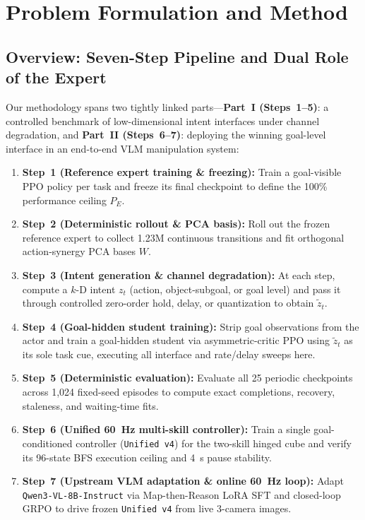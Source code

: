 \section{Problem Formulation and Method}
\label{sec:method}

\subsection{Overview: Seven-Step Pipeline and Dual Role of the Expert}
\label{sec:method_overview}
Our methodology spans two tightly linked parts---\textbf{Part~I (Steps~1--5)}: a controlled benchmark of low-dimensional intent interfaces under channel degradation, and \textbf{Part~II (Steps~6--7)}: deploying the winning goal-level interface in an end-to-end VLM manipulation system:
\begin{enumerate}[leftmargin=1.5em,itemsep=1.5pt,topsep=2pt]
  \item \textbf{Step~1 (Reference expert training \& freezing):} Train a goal-visible PPO policy per task and freeze its final checkpoint to define the 100\% performance ceiling $P_E$.
  \item \textbf{Step~2 (Deterministic rollout \& PCA basis):} Roll out the frozen reference expert to collect 1.23M continuous transitions and fit orthogonal action-synergy PCA bases $W$.
  \item \textbf{Step~3 (Intent generation \& channel degradation):} At each step, compute a $k$-D intent $z_t$ (action, object-subgoal, or goal level) and pass it through controlled zero-order hold, delay, or quantization to obtain $\tilde{z}_t$.
  \item \textbf{Step~4 (Goal-hidden student training):} Strip goal observations from the actor and train a goal-hidden student via asymmetric-critic PPO using $\tilde{z}_t$ as its sole task cue, executing all interface and rate/delay sweeps here.
  \item \textbf{Step~5 (Deterministic evaluation):} Evaluate all 25 periodic checkpoints across 1,024 fixed-seed episodes to compute exact completions, recovery, staleness, and waiting-time fits.
  \item \textbf{Step~6 (Unified 60~Hz multi-skill controller):} Train a single goal-conditioned controller (\texttt{Unified v4}) for the two-skill hinged cube and verify its 96-state BFS execution ceiling and 4~s pause stability.
  \item \textbf{Step~7 (Upstream VLM adaptation \& online 60~Hz loop):} Adapt \texttt{Qwen3-VL-8B-Instruct} via Map-then-Reason LoRA SFT and closed-loop GRPO to drive frozen \texttt{Unified v4} from live 3-camera images.
\end{enumerate}

